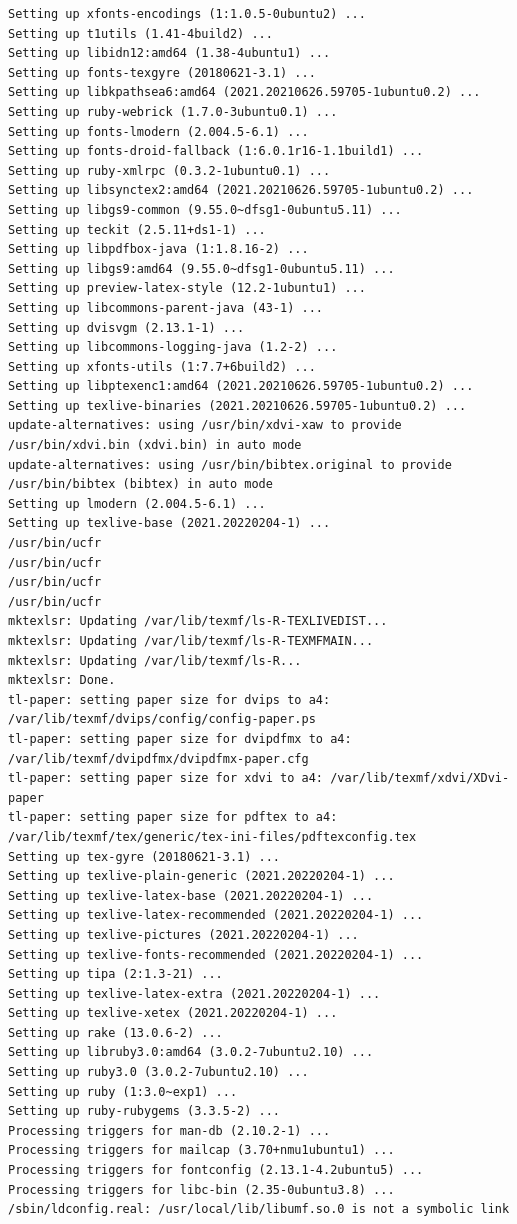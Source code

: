 \documentclass[
  11pt,
  letterpaper,
]{book}
\begin{document}
\begin{verbatim}
Setting up xfonts-encodings (1:1.0.5-0ubuntu2) ...
Setting up t1utils (1.41-4build2) ...
Setting up libidn12:amd64 (1.38-4ubuntu1) ...
Setting up fonts-texgyre (20180621-3.1) ...
Setting up libkpathsea6:amd64 (2021.20210626.59705-1ubuntu0.2) ...
Setting up ruby-webrick (1.7.0-3ubuntu0.1) ...
Setting up fonts-lmodern (2.004.5-6.1) ...
Setting up fonts-droid-fallback (1:6.0.1r16-1.1build1) ...
Setting up ruby-xmlrpc (0.3.2-1ubuntu0.1) ...
Setting up libsynctex2:amd64 (2021.20210626.59705-1ubuntu0.2) ...
Setting up libgs9-common (9.55.0~dfsg1-0ubuntu5.11) ...
Setting up teckit (2.5.11+ds1-1) ...
Setting up libpdfbox-java (1:1.8.16-2) ...
Setting up libgs9:amd64 (9.55.0~dfsg1-0ubuntu5.11) ...
Setting up preview-latex-style (12.2-1ubuntu1) ...
Setting up libcommons-parent-java (43-1) ...
Setting up dvisvgm (2.13.1-1) ...
Setting up libcommons-logging-java (1.2-2) ...
Setting up xfonts-utils (1:7.7+6build2) ...
Setting up libptexenc1:amd64 (2021.20210626.59705-1ubuntu0.2) ...
Setting up texlive-binaries (2021.20210626.59705-1ubuntu0.2) ...
update-alternatives: using /usr/bin/xdvi-xaw to provide /usr/bin/xdvi.bin (xdvi.bin) in auto mode
update-alternatives: using /usr/bin/bibtex.original to provide /usr/bin/bibtex (bibtex) in auto mode
Setting up lmodern (2.004.5-6.1) ...
Setting up texlive-base (2021.20220204-1) ...
/usr/bin/ucfr
/usr/bin/ucfr
/usr/bin/ucfr
/usr/bin/ucfr
mktexlsr: Updating /var/lib/texmf/ls-R-TEXLIVEDIST... 
mktexlsr: Updating /var/lib/texmf/ls-R-TEXMFMAIN... 
mktexlsr: Updating /var/lib/texmf/ls-R... 
mktexlsr: Done.
tl-paper: setting paper size for dvips to a4: /var/lib/texmf/dvips/config/config-paper.ps
tl-paper: setting paper size for dvipdfmx to a4: /var/lib/texmf/dvipdfmx/dvipdfmx-paper.cfg
tl-paper: setting paper size for xdvi to a4: /var/lib/texmf/xdvi/XDvi-paper
tl-paper: setting paper size for pdftex to a4: /var/lib/texmf/tex/generic/tex-ini-files/pdftexconfig.tex
Setting up tex-gyre (20180621-3.1) ...
Setting up texlive-plain-generic (2021.20220204-1) ...
Setting up texlive-latex-base (2021.20220204-1) ...
Setting up texlive-latex-recommended (2021.20220204-1) ...
Setting up texlive-pictures (2021.20220204-1) ...
Setting up texlive-fonts-recommended (2021.20220204-1) ...
Setting up tipa (2:1.3-21) ...
Setting up texlive-latex-extra (2021.20220204-1) ...
Setting up texlive-xetex (2021.20220204-1) ...
Setting up rake (13.0.6-2) ...
Setting up libruby3.0:amd64 (3.0.2-7ubuntu2.10) ...
Setting up ruby3.0 (3.0.2-7ubuntu2.10) ...
Setting up ruby (1:3.0~exp1) ...
Setting up ruby-rubygems (3.3.5-2) ...
Processing triggers for man-db (2.10.2-1) ...
Processing triggers for mailcap (3.70+nmu1ubuntu1) ...
Processing triggers for fontconfig (2.13.1-4.2ubuntu5) ...
Processing triggers for libc-bin (2.35-0ubuntu3.8) ...
/sbin/ldconfig.real: /usr/local/lib/libumf.so.0 is not a symbolic link


\end{verbatim}
\end{document}
